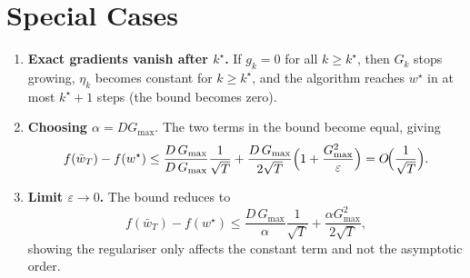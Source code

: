 \documentclass{article}
\begin{document}
\section*{Special Cases}
\begin{enumerate}[label=\alph*)]
\item \textbf{Exact gradients vanish after $k^{\star}$.}  
If $g_k=0$ for all $k\ge k^{\star}$, then $G_k$ stops growing, $\eta_k$ becomes
constant for $k\ge k^{\star}$, and the algorithm reaches $w^{\star}$ in at most
$k^{\star}+1$ steps (the bound becomes zero).

\item \textbf{Choosing $\alpha = D G_{\max}$}.  
The two terms in the bound become equal, giving
\[
f(\bar w_T)-f(w^{\star})\le
\frac{D\,G_{\max}}{D\,G_{\max}}\frac{1}{\sqrt{T}}
+\frac{D\,G_{\max}}{2\sqrt{T}}\Bigl(1+\frac{G_{\max}^{2}}{\varepsilon}\Bigr)
= O\!\Bigl(\frac{1}{\sqrt{T}}\Bigr).
\]

\item \textbf{Limit $\varepsilon\to 0$.}  
The bound reduces to
\[
f(\bar w_T)-f(w^{\star})\le
\frac{D\,G_{\max}}{\alpha}\frac{1}{\sqrt{T}}
+\frac{\alpha G_{\max}^{2}}{2\sqrt{T}},
\]
showing the regulariser only affects the constant term and not the asymptotic order.
\end{enumerate}
\end{document}
